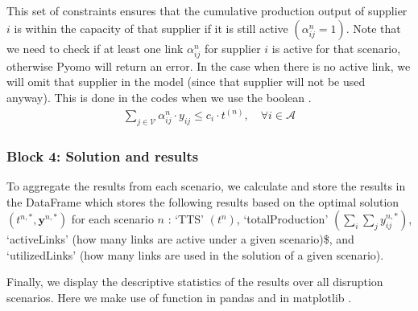 \documentclass[letterpaper,10pt,english]{jupyterBook}
\begin{document}
\sphinxAtStartPar
This set of constraints ensures that the cumulative production output of supplier \(i\) is within the capacity of that supplier if it is still active \(\left(\alpha^{n}_{ij}=1\right)\). Note that we need to check if at least one link \(\alpha^{n}_{ij}\) for supplier \(i\) is active for that scenario, otherwise Pyomo will return an error. In the case when there is no active link, we will omit that supplier in the model (since that supplier will not be used anyway). This is done in the codes when we use the boolean .
\begin{equation*}
\begin{split}\sum_{j\in\mathcal{V}} \alpha^{n}_{ij} \cdot y_{ij}   \leq c_i \cdot t^{(n)},\quad \forall i\in \mathcal{A} \end{split}
\end{equation*}

\subsubsection{Block 4: Solution and results}
\label{\detokenize{docs/Case3_1_Disruption_Risk_Analytics:id1}}
\sphinxAtStartPar
To aggregate the results from each scenario, we calculate and store the results in the  DataFrame which stores the following results based on the optimal solution \(\left( t^{n,*}, \mathbf{y}^{n,*} \right)\) for each scenario \(n\) : ‘TTS’ \((t^n)\), ‘totalProduction’ \(\left( \sum_i \sum_j y_{ij}^{n,*} \right)\), ‘activeLinks’ (how many links are active under a given scenario)\$, and ‘utilizedLinks’ (how many links are used in the solution of a given scenario).

\sphinxAtStartPar
Finally, we display the descriptive statistics of the results over all disruption scenarios. Here we make use of function  in pandas  and  in matplotlib .
\end{document}
